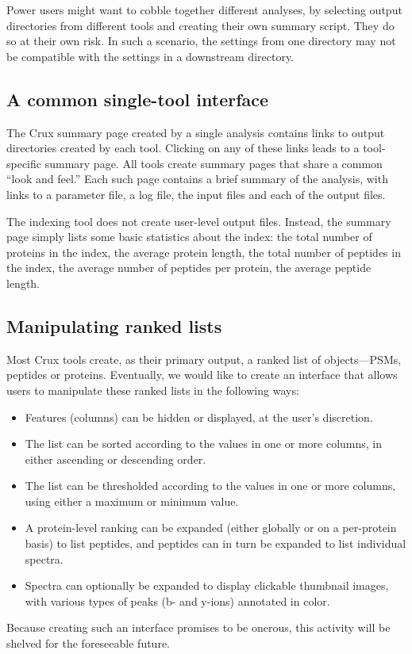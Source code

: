 \documentclass{article}
\begin{document}
Power users might want to cobble together different analyses, by
selecting output directories from different tools and creating their
own summary script.  They do so at their own risk.  In such a
scenario, the settings from one directory may not be compatible with
the settings in a downstream directory.

\subsection{A common single-tool interface}

The Crux summary page created by a single analysis contains links to
output directories created by each tool.  Clicking on any of these
links leads to a tool-specific summary page.  All tools create summary
pages that share a common ``look and feel.''  Each such page contains
a brief summary of the analysis, with links to a parameter file,
a log file, the input files and each of the output files.

The indexing tool does not create user-level output files.  Instead,
the summary page simply lists some basic statistics about the index:
the total number of proteins in the index, the average protein length,
the total number of peptides in the index, the average number of
peptides per protein, the average peptide length.

\subsection{Manipulating ranked lists}

Most Crux tools create, as their primary output, a ranked list of
objects---PSMs, peptides or proteins.  Eventually, we would like to
create an interface that allows users to manipulate these ranked lists
in the following ways:
\begin{itemize}
\item Features (columns) can be hidden or displayed, at the user's
  discretion.
\item The list can be sorted according to the values in one or more
  columns, in either ascending or descending order.
\item The list can be thresholded according to the values in one or
  more columns, using either a maximum or minimum value.
\item A protein-level ranking can be expanded (either globally or on a
  per-protein basis) to list peptides, and peptides can in turn be
  expanded to list individual spectra.
\item Spectra can optionally be expanded to display clickable
  thumbnail images, with various types of peaks (b- and y-ions)
  annotated in color.
\end{itemize}
Because creating such an interface promises to be onerous, this
activity will be shelved for the foreseeable future.
\end{document}
